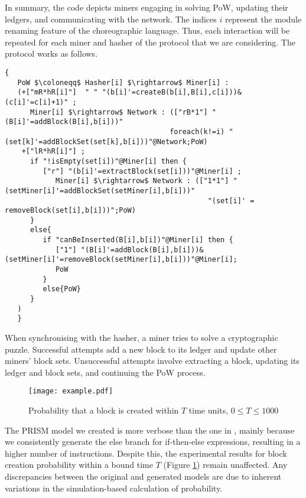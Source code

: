 In summary, the code depicts miners engaging in
  solving PoW, updating their ledgers, and communicating with the
  network.  The indices $i$ represent the module renaming feature of
  the choreographic language. Thus, each interaction will be repeated
  for each miner and hasher of the protocol that we are
  considering. The protocol works as follows. 
  \begin{lstlisting}[style=chor-color,breaklines=true, postbreak=\mbox{\textcolor{red}{$\hookrightarrow$}\space},caption={Choreography for the Proof of Work Bitcoin Protocol},captionpos=b,label={ex3-code}]
   {
   PoW $\coloneqq$ Hasher[i] $\rightarrow$ Miner[i] :
   (+["mR*hR[i]"]  " " "(b[i]'=createB(b[i],B[i],c[i]))&(c[i]'=c[i]+1)" ; 
      Miner[i] $\rightarrow$ Network : (["rB*1"] "(B[i]'=addBlock(B[i],b[i]))" 
                                       foreach(k!=i) "(set[k]'=addBlockSet(set[k],b[i]))"@Network;PoW)
    +["lR*hR[i]"] ; 
      if "!isEmpty(set[i])"@Miner[i] then { 
         ["r"] "(b[i]'=extractBlock(set[i]))"@Miner[i] ;  
            Miner[i] $\rightarrow$ Network : (["1*1"] "(setMiner[i]'=addBlockSet(setMiner[i],b[i]))" 
                                                "(set[i]' = removeBlock(set[i],b[i]))";PoW) 
      }
      else{
         if "canBeInserted(B[i],b[i])"@Miner[i] then { 
            ["1"] "(B[i]'=addBlock(B[i],b[i]))&(setMiner[i]'=removeBlock(setMiner[i],b[i]))"@Miner[i];
            PoW 
         }
         else{PoW}
      }
   )
   } 
   \end{lstlisting}
  When synchronising with
  the hasher, a miner tries to solve a cryptographic
  puzzle. Successful attempts add a new block to its ledger and update other miners' block sets. Unsuccessful attempts involve extracting a block, updating its ledger and block sets, and continuing the PoW process.
  \begin{figure}[h]
   \centering
   \texttt{[image: example.pdf]}	
   \caption{Probability that a block is created within $T$ time units, $0\leq T\leq 1000$}
   \label{ex3-res}
\end{figure}
The PRISM model we created is more verbose than the one in \cite{DBLP:journals/concurrency/BistarelliNGLMV23}, mainly because we consistently generate the else branch for if-then-else expressions, resulting in a higher number of instructions. Despite this, the experimental results for block creation probability within a bound time $T$ (Figure \ref{ex3-res}) remain unaffected. Any discrepancies between the original and generated models are due to inherent variations in the simulation-based calculation of probability.


